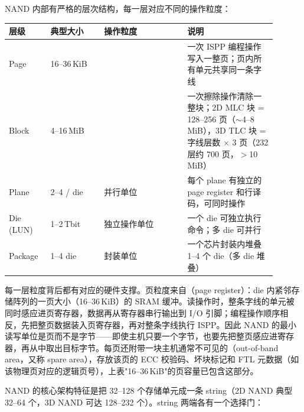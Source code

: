 
NAND 内部有严格的层次结构，每一层对应不同的操作粒度：

\begin{longtable}{L{0.14\linewidth}L{0.18\linewidth}L{0.28\linewidth}L{0.3\linewidth}}
\toprule
层级 & 典型大小 & 操作粒度 & 说明 \\
\midrule
Page & 16--36\,KiB &  & 一次 ISPP 编程操作写入一整页；页内所有单元共享同一条字线 \\
Block & 4--16\,MiB &  & 一次擦除操作清除一整块；2D MLC 块 = 128--256 页（$\sim$4--8\,MiB），3D TLC 块 = 字线层数 $\times$ 3 页（232 层约 700 页，$>$10\,MiB）\\
Plane & 2--4 / die & 并行单位 & 每个 plane 有独立的 page register 和行译码，可同时操作 \\
Die (LUN) & 1--2\,Tbit & 独立操作单位 & 一个 die 可独立执行命令；多 die 可并行 \\
Package & 1--4 die & 封装单位 & 一个芯片封装内堆叠 1--4 个 die（多 die 堆叠） \\
\bottomrule
\end{longtable}

每一层粒度背后都有对应的硬件支撑。页粒度来自（page register）：die 内紧邻存储阵列的一页大小（16--36\,KiB）的 SRAM 缓冲。读操作时，整条字线的单元被同时感应进页寄存器，数据再从寄存器串行输出到 I/O 引脚；编程操作顺序相反，先把整页数据装入页寄存器，再对整条字线执行 ISPP。因此 NAND 的最小读写单位是页而不是字节——即使主机只要一个字节，也要先把整页感应进寄存器，再从中取出目标字节。每页还附带一块主机通常不可见的（out-of-band area，又称 spare area），存放该页的 ECC 校验码、坏块标记和 FTL 元数据（如该物理页对应的逻辑页号），上表"16--36\,KiB"的页容量已包含这部分。



NAND 的核心架构特征是把 32--128 个存储单元成一条 string（2D NAND 典型 32--64 个，3D NAND 可达 128--232 个）。string 两端各有一个选择门：

